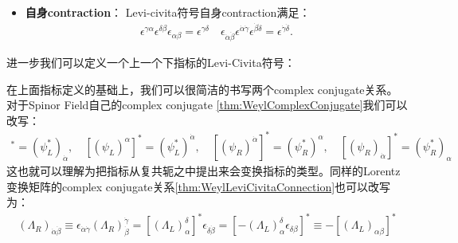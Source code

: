 \begin{itemize}
  \item \textbf{自身contraction}： Levi-civita符号自身contraction满足：
    \begin{align}
      \epsilon^{\gamma\alpha}\epsilon^{\delta\beta}\epsilon_{\alpha\beta}=\epsilon^{\gamma\delta}\quad\epsilon_{\dot{\alpha}\dot{\beta}}\epsilon^{\dot{\alpha}\dot{\gamma}}\epsilon^{\dot{\beta}\dot{\delta}}=\epsilon^{\dot{\gamma}\dot{\delta}}.
    \end{align}
\end{itemize}
进一步我们可以定义一个上一个下指标的Levi-Civita符号：

\bigskip
{}

在上面指标定义的基础上，我们可以很简洁的书写两个complex conjugate关系。对于Spinor Field自己的complex conjugate \cref{thm:WeylComplexConjugate}我们可以改写：
\begin{align}
  [(\psi_L)_\alpha]^*=(\psi_L^*)_{\dot{\alpha}},\quad[(\psi_L)^\alpha]^*=(\psi_L^*)^{\dot{\alpha}},\quad[(\psi_R)^{\dot{\alpha}}]^*=(\psi_R^*)^\alpha,\quad[(\psi_R)_{\dot{\alpha}}]^*=(\psi_R^*)_\alpha
\end{align}
这也就可以理解为把指标从复共轭之中提出来会变换指标的类型。同样的Lorentz变换矩阵的complex conjugate关系\cref{thm:WeylLeviCivitaConnection}也可以改写为：
\begin{align}
  (\Lambda_R)_{\dot{\alpha}\dot{\beta}}\equiv\epsilon_{\dot{\alpha}\dot{\gamma}}\left(\Lambda_R\right)_{\dot{\beta}}^{\dot{\gamma}}=\left[\left(\Lambda_L\right)_\alpha^\delta\right]^*\epsilon_{\dot{\delta}\dot{\beta}}=\left[-\left(\Lambda_L\right)_\alpha^\delta\epsilon_{\delta\beta}\right]^*\equiv-\left[\left(\Lambda_L\right)_{\alpha\beta}\right]^*
\end{align}


